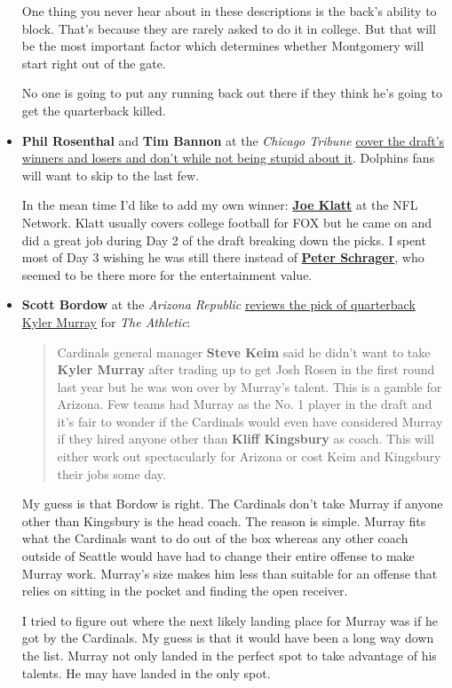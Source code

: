 \begin{itemize}
One thing you never hear about in these descriptions is the back's ability to block.  That's because they are rarely asked to do it in college.  But that will be the most important factor which determines whether Montgomery will start right out of the gate.

No one is going to put any running back out there if they think he's going to get the quarterback killed.

\item \textbf{Phil Rosenthal} and \textbf{Tim Bannon} at the \textit{Chicago Tribune} \href{https://www.chicagotribune.com/sports/football/bears/ct-spt-bears-nfl-draft-winners-losers-espn-20190429-story.html}{cover the draft's winners and losers and don't while not being stupid about it}.  Dolphins fans will want to skip to the last few.

  In the mean time I'd like to add my own winner:  \href{https://en.wikipedia.org/wiki/Joel_Klatt}{\textbf{Joe Klatt}} at the NFL Network.  Klatt usually covers college football for FOX but he came on and did a great job during Day 2 of the draft breaking down the picks.  I spent most of Day 3 wishing he was still there instead of \href{https://en.wikipedia.org/wiki/Peter_Schrager}{\textbf{Peter Schrager}}, who seemed to be there more for the entertainment value.
  
\item \textbf{Scott Bordow} at the \textit{Arizona Republic} \href{https://theathletic.com/945667/2019/04/25/2019-nfl-draft-live-tracker-dane-brugler/}{reviews the pick of quarterback Kyler Murray} for \textit{The Athletic}:

\begin{quote}
  Cardinals general manager \textbf{Steve Keim} said he didn’t want to take \textbf{Kyler Murray} after trading up to get Josh Rosen in the first round last year but he was won over by Murray’s talent. This is a gamble for Arizona. Few teams had Murray as the No. 1 player in the draft and it’s fair to wonder if the Cardinals would even have considered Murray if they hired anyone other than \textbf{Kliff Kingsbury} as coach. This will either work out spectacularly for Arizona or cost Keim and Kingsbury their jobs some day.
\end{quote}

My guess is that Bordow is right.  The Cardinals don't take Murray if anyone other than Kingsbury is the head coach.  The reason is simple.  Murray fits what the Cardinals want to do out of the box whereas any other coach outside of Seattle would have had to change their entire offense to make Murray work.  Murray's size makes him less than suitable for an offense that relies on sitting in the pocket and finding the open receiver.

I tried to figure out where the next likely landing place for Murray was if he got by the Cardinals.  My guess is that it would have been a long way down the list.  Murray not only landed in the perfect spot to take advantage of his talents.  He may have landed in the only spot.  
\end{itemize}
